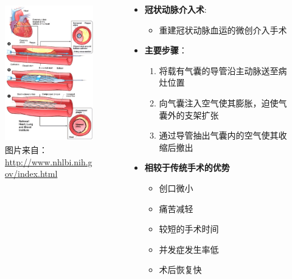 \begin{frame}
\begin{columns}[onlytextwidth]
\begin{column}{0.4\textwidth}
\begin{figure}[t]
\includegraphics[height=170pt]{../../Figures/background/phauthuatmachmau_stent.eps}
\caption[冠状动脉介入术]{图片来自：\\\url{http://www.nhlbi.nih.gov/index.html}}
\end{figure}
\end{column}
\begin{column}{0.5\textwidth}
\begin{itemize}
\item \textbf{冠状动脉介入术}: 
\begin{itemize}
\item \footnotesize{重建冠状动脉血运的微创介入手术}
\end{itemize}
\item \textbf{主要步骤}：
\begin{enumerate}[A]
\item \footnotesize{将载有气囊的导管沿主动脉送至病灶位置}
\item \footnotesize{向气囊注入空气使其膨胀，迫使气囊外的支架扩张}
\item \footnotesize{通过导管抽出气囊内的空气使其收缩后撤出}
\end{enumerate}
\end{itemize}
\begin{itemize}
\item \textbf{相较于传统手术的优势}
\begin{itemize}
\item 创口微小
\item 痛苦减轻
\item 较短的手术时间
\item 并发症发生率低
\item 术后恢复快
\end{itemize}
\end{itemize}
\end{column}
\end{columns}
\end{frame}

